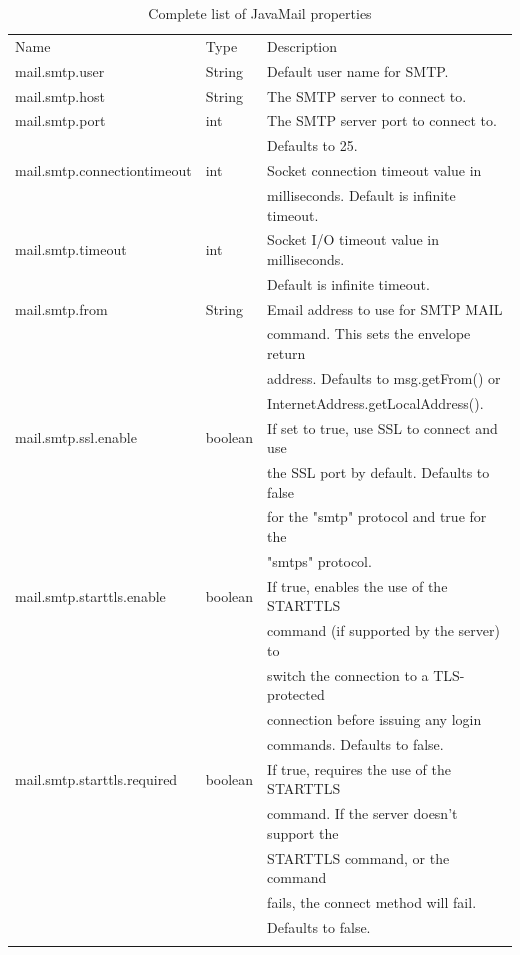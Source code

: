 \documentclass[envcountsame,envcountchap]{svmono}
\begin{document}
\begin{table}
\centering
\caption{Complete list of JavaMail properties}
\label{tab:javamail-properties}
\begin{tabular}{lll}
\hline\noalign{\smallskip}
Name & Type & Description  \\
\noalign{\smallskip}\hline\noalign{\smallskip}
mail.smtp.user & String & Default user name for SMTP. \\
mail.smtp.host & String & The SMTP server to connect to. \\
mail.smtp.port & int & The SMTP server port to connect to.\\ & & Defaults to 25. \\
mail.smtp.connectiontimeout & int & Socket connection timeout value in \\ & & milliseconds. Default is infinite timeout.\\
mail.smtp.timeout & int & Socket I/O timeout value in milliseconds. \\ & & Default is infinite timeout. \\
mail.smtp.from & String & Email address to use for SMTP MAIL \\ & & command. This sets the envelope return \\ & & address. Defaults to msg.getFrom() or \\ & & InternetAddress.getLocalAddress(). \\
mail.smtp.ssl.enable & boolean & If set to true, use SSL to connect and use \\ & & the SSL port by default. Defaults to false \\ & & for the "smtp" protocol and true for the \\ & & "smtps" protocol. \\
mail.smtp.starttls.enable & boolean & If true, enables the use of the STARTTLS\\ & & command (if supported by the server) to\\ & & switch the connection to a TLS-protected\\ & & connection before issuing any login\\ & & commands. Defaults to false. \\
mail.smtp.starttls.required & boolean & If true, requires the use of the STARTTLS \\ & & command. If the server doesn't support the \\ & & STARTTLS command, or the command \\ & & fails, the connect method will fail. \\ & &Defaults to false. \\
\noalign{\smallskip}\hline
\end{tabular}
\end{table}

\backmatter

\printindex

\begin{thebibliography}{99.}
\end{thebibliography}
\end{document}
